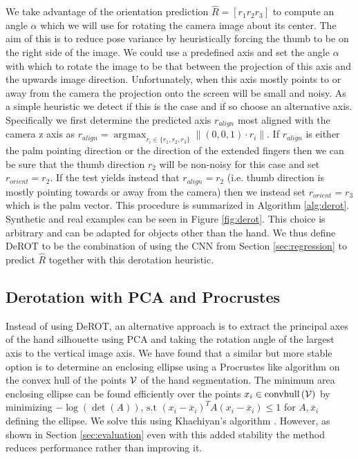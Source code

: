 \documentclass{bmvc2k}
\DeclareMathOperator*{\argmax}{\arg\!\max}
\begin{document}
We take advantage of the orientation prediction $\hat{R}=\left[r_1 r_2 r_3\right]$ to compute an angle $\alpha$ which we will use for rotating the camera image about its center. The aim of this is to reduce pose variance by heuristically forcing the thumb to be on the right side of the image. We could use a predefined axis and set the angle $\alpha$ with which to rotate the image to be that between the projection of this axis and the upwards image direction. Unfortunately, when this axis mostly points to or away from the camera the projection onto the screen will be small and noisy. As a simple heuristic we detect if this is the case and if so choose an alternative axis. Specifically we first determine the predicted axis $r_{align}$ most aligned with the camera z axis as $r_{align}=\argmax_{r_i \in \{r_1,r_2,r_3\}} \|\left(0,0,1\right)\cdot r_i\|$. If $r_{align}$ is either the palm pointing direction or the direction of the extended fingers then we can be sure that the thumb direction $r_2$ will be non-noisy for this case and set $r_{orient}=r_2$. If the test yields instead that $r_{align}=r_2$ (i.e. thumb direction is mostly pointing towards or away from the camera) then we instead set $r_{orient}=r_3$ which is the palm vector. This procedure is summarized in Algorithm \ref{alg:derot}. Synthetic and real examples can be seen in Figure \ref{fig:derot}. This choice is arbitrary and can be adapted for objects other than the hand. We thus define DeROT to be the combination of using the CNN from Section \ref{sec:regression} to predict $\hat{R}$ together with this derotation heuristic. 


\subsection{Derotation with PCA and Procrustes} \label{sec:pca}
Instead of using DeROT, an alternative approach is to extract the principal axes of the hand silhouette using PCA and taking the rotation angle of the largest axis to the vertical image axis. We have found that a similar but more stable option is to determine an enclosing ellipse using a Procrustes like algorithm on the convex hull of the points $\cal V$ of the hand segmentation. The minimum area enclosing ellipse can be found efficiently over the points $x_i\in\text{convhull}\left({\cal V}\right)$ by minimizing $-\log \left( {\det \left( A \right)} \right) \text{,  s.t  } {\left( {{x_i} - {\overline x_i}} \right)^T}A\left( {{x_i} - {\overline x_i}} \right)\leq 1$ for $A,{\overline x_i}$ defining the ellipse. We solve this using Khachiyan's algorithm \cite{AspvallS80}. However, as shown in Section \ref{sec:evaluation} even with this added stability the method reduces performance rather than improving it. 
 
\end{document}
